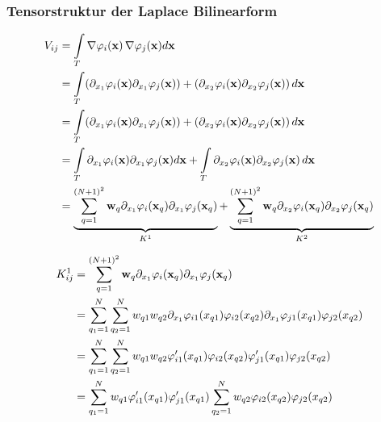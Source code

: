 \begin{frame}
\frametitle{Tensorstruktur der Laplace Bilinearform}
\begin{equation*}
\begin{aligned}
V_{ij} &= \int\limits_{T} \nabla \varphi_i(\bold{x}) \, \nabla \varphi_j(\bold{x})  d \bold{x} \\ 
&= \int\limits_{T}( \partial_{x_1}  \varphi_i(\bold{x})  \partial_{x_1} \varphi_j(\bold{x})) + ( \partial_{x_2} \varphi_i(\bold{x})  \partial_{x_2} \varphi_j(\bold{x})) \, d\bold{x} \\
&= \int\limits_{T}( \partial_{x_1}  \varphi_i(\bold{x})  \partial_{x_1} \varphi_j(\bold{x})) + ( \partial_{x_2} \varphi_i(\bold{x})  \partial_{x_2} \varphi_j(\bold{x})) \, d\bold{x} \\ &= \int\limits_{T} \partial_{x_1}  \varphi_i(\bold{x})  \partial_{x_1} \varphi_j(\bold{x}) d\bold{x} + \int\limits_{T}  \partial_{x_2} \varphi_i(\bold{x})  \partial_{x_2} \varphi_j(\bold{x}) \, d\bold{x} \\
&= \underbrace{\sum\limits_{q=1}^{(N+1)^2} \bold{w}_q \partial_{x_1}  \varphi_i(\bold{x}_q)  \partial_{x_1} \varphi_j (\bold{x}_q)}_{K^1} + \underbrace{\sum\limits_{q=1}^{(N+1)^2} \bold{w}_q  \partial_{x_2} \varphi_i(\bold{x}_q)  \partial_{x_2} \varphi_j(\bold{x}_q)}_{K^2} \, 
\end{aligned}
\end{equation*}
\end{frame}

\begin{frame}
\begin{equation*}
\begin{aligned}
K_{ij}^1 &=\sum\limits_{q=1}^{(N+1)^2} \bold{w}_q \partial_{x_1}  \varphi_i(\bold{x}_q)  \partial_{x_1} \varphi_j (\bold{x}_q) \\ &= \sum\limits_{q_1=1}^{N} \sum\limits_{q_2=1}^{N} w_{q1}w_{q2} \partial_{x_1}  \varphi_{i1}(x_{q1})\varphi_{i2}(x_{q2})  \partial_{x_1} \varphi_{j1} (x_{q1})\varphi_{j2} (x_{q2}) \\
&=  \sum\limits_{q_1=1}^{N} \sum\limits_{q_2=1}^{N} w_{q1}w_{q2} \varphi'_{i1}(x_{q1})\varphi_{i2}(x_{q2})  \varphi'_{j1} (x_{q1})\varphi_{j2} (x_{q2}) \\ 
&= \sum\limits_{q_1=1}^{N} w_{q1} \varphi'_{i1}(x_{q1}) \varphi'_{j1} (x_{q1}) \sum\limits_{q_2=1}^{N} w_{q2} \varphi_{i2}(x_{q2})  \varphi_{j2} (x_{q2}) 
\end{aligned}
\end{equation*}
\end{frame}

